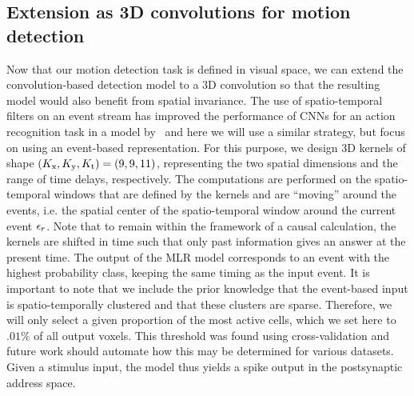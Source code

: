 \documentclass[default]{sn-jnl}%
\theoremstyle{thmstyleone}%
\theoremstyle{thmstyletwo}%
\theoremstyle{thmstylethree}%
\begin{document}
\subsection{Extension as 3D convolutions for motion detection}
%
Now that our motion detection task is defined in visual space, we can extend the convolution-based detection model to a 3D convolution so that the resulting model would also benefit from spatial invariance. The use of spatio-temporal filters on an event stream has improved the performance of CNNs for an action recognition task in a model by~\citet{ghosh_spatiotemporal_2019} and here we will use a similar strategy, but focus on using an event-based representation.
For this purpose, we design 3D kernels of shape $(K_\text{x}, K_\text{y}, K_\text{t}) = (9, 9, 11)$, representing the two spatial dimensions and the range of time delays, respectively.
The computations are performed on the spatio-temporal windows that are defined by the kernels and are ``moving'' around the events, i.e. the spatial center of the spatio-temporal window around the current event $\epsilon_r$. Note that to remain within the framework of a causal calculation, the kernels are shifted in time such that only past information gives an answer at the present time.
%
The output of the MLR model corresponds to an event with the highest probability class, keeping the same timing as the input event. It is important to note that we include the prior knowledge that the event-based input is spatio-temporally clustered and that these clusters are sparse. Therefore, we will only select a given proportion of the most active cells, which we set here to $.01\%$ of all output voxels. This threshold was found using cross-validation and future work should automate how this may be determined for various datasets. Given a stimulus input, the model thus yields a spike output in the postsynaptic address space.
\end{document}
